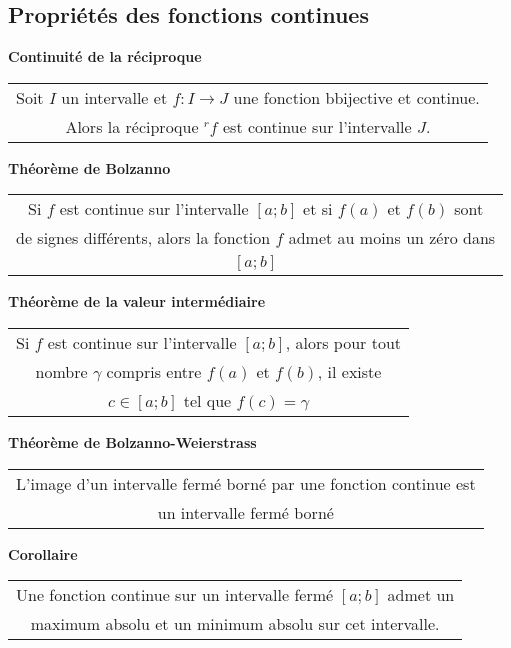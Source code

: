 \documentclass[12pt, a4paper]{book}
\begin{document}
\subsection{Propriétés des fonctions continues}
\textbf{Continuité de la réciproque}
\begin{center}
    \begin{tabular}{|c|}
        \hline
        Soit $I$ un intervalle et $f:I \rightarrow J$ une fonction bbijective et continue.\\
        Alors la réciproque ${}^rf$ est continue sur l'intervalle $J$.\\
        \hline
    \end{tabular}
\end{center}
\textbf{Théorème de Bolzanno}
\begin{center}
    \begin{tabular}{|c|}
        \hline
        Si $f$ est continue sur l'intervalle $[a;b]$ et si $f(a)$ et $f(b)$ sont\\
        de signes différents, alors la fonction $f$ admet au moins un zéro dans\\
        $[a;b]$\\
        \hline
    \end{tabular}
\end{center}
\textbf{Théorème de la valeur intermédiaire}
\begin{center}
    \begin{tabular}{|c|}
        \hline
        Si $f$ est continue sur l'intervalle $[a;b]$, alors pour tout\\
        nombre $\gamma$ compris entre $f(a)$ et $f(b)$, il existe\\
        $c \in [a;b]$ tel que $f(c) = \gamma$\\
        \hline
    \end{tabular}
\end{center}
\textbf{Théorème de Bolzanno-Weierstrass}
\begin{center}
    \begin{tabular}{|c|}
        \hline
       L'image d'un intervalle fermé borné par une fonction continue est\\ 
       un intervalle fermé borné\\
        \hline
    \end{tabular}
\end{center}
\textbf{Corollaire}
\begin{center}
    \begin{tabular}{|c|}
        \hline
       Une fonction continue sur un intervalle fermé $[a;b]$ admet un\\
       maximum absolu et un minimum absolu sur cet intervalle.\\
        \hline
    \end{tabular}
\end{center}
\end{document}
